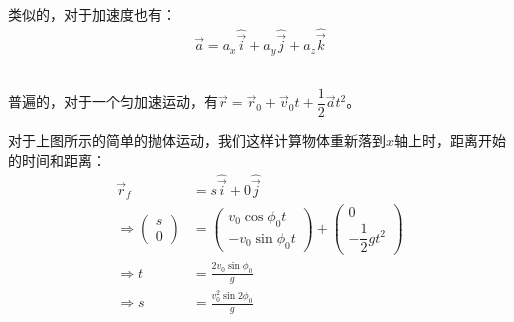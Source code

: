 类似的，对于加速度也有：
\begin{equation}
  \begin{aligned}
   \vec{a}=a_{x}\hat{\vec{i}}+a_{y}\hat{\vec{j}}+a_{z}\hat{\vec{k}}
   \end{aligned}
  \nonumber
\end{equation}

\subsection[抛体运动]{}
\begin{center}
\end{center}

普遍的，对于一个匀加速运动，有$\vec{r}=\vec{r}_{0}+\vec{v}_{0}t+\dfrac{1}{2}\vec{a}t^{2}$。

\vspace*{0.4ex}
对于上图所示的简单的抛体运动，我们这样计算物体重新落到$x$轴上时，距离开始的时间和距离：
\begin{equation}
  \begin{aligned}
   \vec{r}_{f}&=s\hat{\vec{i}}+0\hat{\vec{j}}\\
   \Rightarrow\begin{pmatrix}
    s\\
    0
   \end{pmatrix}&=\begin{pmatrix}
                   v_{0}\cos\phi_{0}t\\
                   -v_{0}\sin\phi_{0}t 
                 \end{pmatrix}+\begin{pmatrix}
                                            0\\
                                            -\dfrac{1}{2}gt^{2}
                                          \end{pmatrix}\\
   \Longrightarrow t&=\frac{2v_{0}\sin\phi_{0}}{g}\\
   \Longrightarrow s&=\frac{v_{0}^{2}\sin2\phi_{0}}{g}
  \end{aligned}
  \nonumber
\end{equation}

